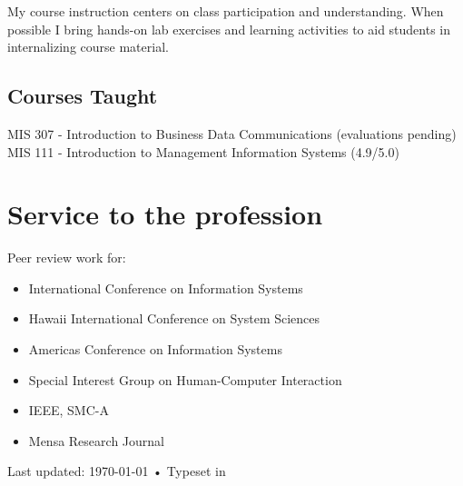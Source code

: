 \documentclass[10pt, a4paper]{article}
\newcommand{\years}[1]{\marginnote{\scriptsize #1}}
\begin{document}
My course instruction centers on class participation and understanding. When
possible I bring hands-on lab exercises and learning activities to aid students
in internalizing course material.

\subsection*{Courses Taught}

\years{2013}MIS 307 - Introduction to Business Data Communications (evaluations pending)\\
\years{2012}MIS 111 - Introduction to Management Information Systems (4.9/5.0)

\section*{Service to the profession}
Peer review work for:

\begin{itemize}
\itemsep0em
\item International Conference on Information Systems
\item Hawaii International Conference on System Sciences
\item Americas Conference on Information Systems
\item Special Interest Group on Human-Computer Interaction
\item IEEE, SMC-A
\item Mensa Research Journal
\end{itemize}

\vfill{}

\begin{center}
{\scriptsize  Last updated: \today\- •\- 
Typeset in \href{http://nitens.org/taraborelli/cvtex}{
\XeTeX }\\
}
\end{center}
\end{document}
